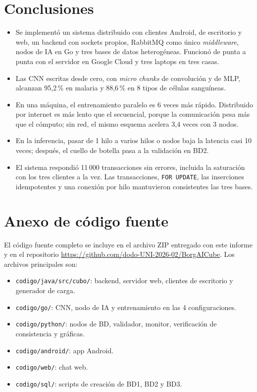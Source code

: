\documentclass[10pt,a4paper]{article}
\begin{document}
\section{Conclusiones}

\begin{itemize}
    \item Se implementó un sistema distribuido con clientes Android, de escritorio y web, un backend con
    sockets propios, RabbitMQ como único \textit{middleware}, nodos de IA en Go y tres bases de datos
    heterogéneas. Funcionó de punta a punta con el servidor en Google Cloud y tres laptops en tres casas.
    \item Las CNN escritas desde cero, con \textit{micro chunks} de convolución y de MLP, alcanzan
    95,2\,\% en malaria y 88,6\,\% en 8 tipos de células sanguíneas.
    \item En una máquina, el entrenamiento paralelo es 6 veces más rápido. Distribuido por internet es
    más lento que el secuencial, porque la comunicación pesa más que el cómputo; sin red, el mismo
    esquema acelera 3,4 veces con 3 nodos.
    \item En la inferencia, pasar de 1 hilo a varios hilos o nodos baja la latencia casi 10 veces;
    después, el cuello de botella pasa a la validación en BD2.
    \item El sistema respondió 11\,000 transacciones sin errores, incluida la saturación con los tres
    clientes a la vez. Las transacciones, \texttt{FOR UPDATE}, las inserciones idempotentes y una
    conexión por hilo mantuvieron consistentes las tres bases.
\end{itemize}

\section{Anexo de código fuente}

El código fuente completo se incluye en el archivo ZIP entregado con este informe y en el repositorio
\url{https://github.com/dodo-UNI-2026-02/BorgAICube}. Los archivos principales son:
\begin{itemize}
    \item \texttt{codigo/java/src/cubo/}: backend, servidor web, clientes de escritorio y generador de carga.
    \item \texttt{codigo/go/}: CNN, nodo de IA y entrenamiento en las 4 configuraciones.
    \item \texttt{codigo/python/}: nodos de BD, validador, monitor, verificación de consistencia y gráficas.
    \item \texttt{codigo/android/}: app Android.
    \item \texttt{codigo/web/}: chat web.
    \item \texttt{codigo/sql/}: scripts de creación de BD1, BD2 y BD3.
\end{itemize}
\end{document}
